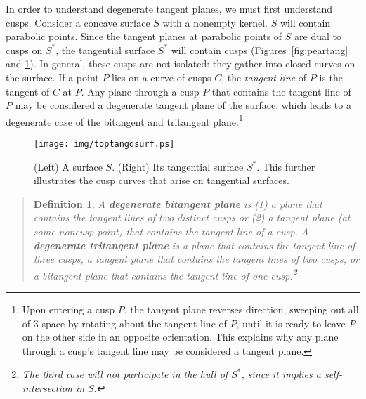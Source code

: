 \documentclass[twoside]{article}
\newtheorem{definitionenv}{Definition}
\newenvironment{defn2}{\begin{quote}\begin{definitionenv}}%
                           {\end{definitionenv}\end{quote}}
\begin{document}
In order to understand degenerate tangent planes, we must first understand cusps.
Consider a concave
surface $S$ with a nonempty kernel.
$S$ will contain parabolic points.
Since the tangent planes at parabolic points of $S$ are dual to cusps on $S^*$,
the tangential surface $S^*$ will contain cusps 
(Figures~\ref{fig:peartang} and \ref{fig:toptangdsurf}).
In general, these cusps are not isolated: they gather into closed curves on the surface.
If a point $P$ lies on a curve of cusps $C$,
the {\em tangent line} of $P$ is the tangent of $C$ at $P$.
Any plane through a cusp $P$ that contains the tangent line of $P$ may be considered
a degenerate tangent plane of the surface,
which leads to a degenerate case of the bitangent and tritangent plane.\footnote{Upon entering a cusp $P$, 
	the tangent plane reverses direction, sweeping out all of 3-space 
	by rotating about the tangent line of $P$,
	until it is ready to leave $P$ on the other side in an opposite orientation.
        This explains why any plane through a cusp's tangent line may be considered a tangent plane.}



\begin{figure}[htbp]
\vspace*{14pt}
\begin{center}
\texttt{[image: img/toptangdsurf.ps]}
\end{center}
\caption{(Left) A surface $S$. (Right) Its tangential surface $S^*$.
This further illustrates the cusp curves that arise on tangential surfaces.}
\label{fig:toptangdsurf}
\end{figure}

\begin{defn2}
A {\bf degenerate bitangent plane} is 
(1) a plane that contains the tangent lines of two distinct cusps or
(2) a tangent plane (at some noncusp point) that contains the tangent line of a cusp. 
A {\bf degenerate tritangent plane} is 
a plane that contains the tangent line of three cusps, 
a tangent plane that contains the tangent lines of two cusps,
or a bitangent plane that contains the tangent line of one cusp.\footnote{The
	third case will not participate in the hull of $S^*$, since
	it implies a self-intersection in $S$.}
\end{defn2}
\end{document}
